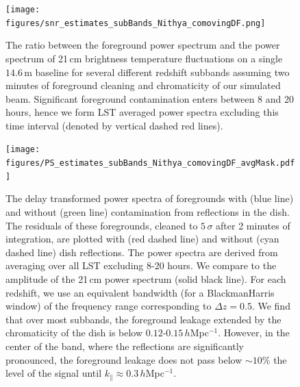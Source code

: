 \documentclass[twocolumn]{emulateapj}
\begin{document}
\begin{figure}
\centering
\texttt{[image: figures/snr\_estimates\_subBands\_Nithya\_comovingDF.png]}
\caption{The ratio between the foreground power spectrum and the power spectrum of 21\,cm brightness temperature fluctuations on a single $14.6$\,m baseline for several different redshift subbands assuming two minutes of foreground cleaning and chromaticity of our simulated beam. Significant foreground contamination enters between 8 and 20 hours, hence we form LST averaged power spectra excluding this time interval (denoted by vertical dashed red lines).}
\label{fig:LSTs}
\end{figure}

\begin{figure}
\centering
\texttt{[image: figures/PS\_estimates\_subBands\_Nithya\_comovingDF\_avgMask.pdf]}
\caption{The delay transformed power spectra of foregrounds with (blue line) and without (green line) contamination from reflections in the dish. The residuals of these foregrounds, cleaned to $5\,\sigma$ after 2 minutes of integration, are plotted with (red dashed line) and without (cyan dashed line) dish reflections. The power spectra are derived from averaging over all LST excluding 8-20 hours. We compare to the amplitude of the 21\,cm power spectrum (solid black line). For each redshift, we use an equivalent bandwidth (for a BlackmanHarris window) of the frequency range corresponding to $\Delta z = 0.5$. We find that over most subbands, the foreground leakage extended by the chromaticity of the dish is below $0.12$-$0.15$\,$h$Mpc$^{-1}$. However, in the center of the band, where the reflections are significantly pronounced, the foreground leakage does not pass below $\sim 10$\% the level of the signal until  $k_\parallel \approx 0.3$\,$h$Mpc$^{-1}$.}
\label{fig:SignalCompare}
\end{figure}
\end{document}
